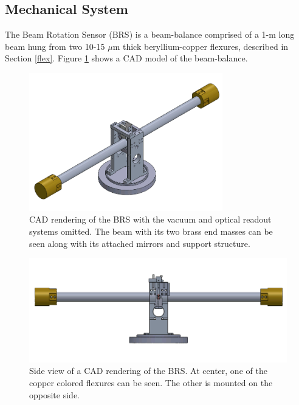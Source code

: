 \documentclass [12pt, proquest]{uwthesis}[2019]
\begin{document}
\subsection{Mechanical System}

\quad The Beam Rotation Sensor (BRS) is a beam-balance comprised of a 1-m long beam hung from two 10-15 $\mu$m thick beryllium-copper flexures, described in Section \ref{flex}. Figure \ref{BRSImage} shows a CAD model of the beam-balance. 

\begin{figure}
\begin{center} \includegraphics[width=0.75\textwidth]{BRSIso.png}
\caption[CAD rendering of the BRS]{CAD rendering of the BRS with the vacuum and optical readout systems omitted. The beam with its two brass end masses can be seen along with its attached mirrors and support structure. }
\end{center}
\end{figure} 
\begin{figure}
\begin{center} 
\includegraphics[width=\textwidth]{BRSFront.png}
\end{center}
\caption[Side view of a CAD rendering of the BRS]{Side view of a CAD rendering of the BRS. At center, one of the copper colored flexures can be seen. The other is mounted on the opposite side.}
\label{BRSImage}
\end{figure}
\end{document}
